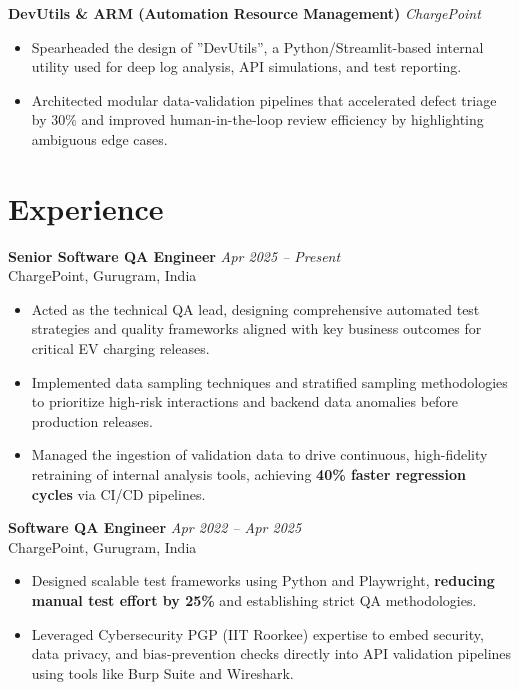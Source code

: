 \documentclass[a4paper,10pt]{article}
\begin{document}
\textbf{DevUtils \& ARM (Automation Resource Management)} \hfill \textit{ChargePoint}
\begin{itemize}
    \item Spearheaded the design of ''DevUtils'', a Python/Streamlit-based internal utility used for deep log analysis, API simulations, and test reporting.
    \item Architected modular data-validation pipelines that accelerated defect triage by 30\% and improved human-in-the-loop review efficiency by highlighting ambiguous edge cases.
\end{itemize}

\section{Experience}

\textbf{Senior Software QA Engineer} \hfill \textit{Apr 2025 – Present}\\
ChargePoint, Gurugram, India
\begin{itemize}
    \item Acted as the technical QA lead, designing comprehensive automated test strategies and quality frameworks aligned with key business outcomes for critical EV charging releases.
    \item Implemented data sampling techniques and stratified sampling methodologies to prioritize high-risk interactions and backend data anomalies before production releases.
    \item Managed the ingestion of validation data to drive continuous, high-fidelity retraining of internal analysis tools, achieving \textbf{40\% faster regression cycles} via CI/CD pipelines.
\end{itemize}

\textbf{Software QA Engineer} \hfill \textit{Apr 2022 – Apr 2025}\\
ChargePoint, Gurugram, India
\begin{itemize}
    \item Designed scalable test frameworks using Python and Playwright, \textbf{reducing manual test effort by 25\%} and establishing strict QA methodologies.
    \item Leveraged Cybersecurity PGP (IIT Roorkee) expertise to embed security, data privacy, and bias-prevention checks directly into API validation pipelines using tools like Burp Suite and Wireshark.
\end{itemize}
\end{document}
